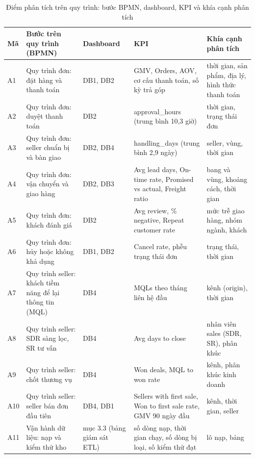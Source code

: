 \begin{table}[htbp]\centering\scriptsize\caption{Điểm phân tích trên quy trình: bước BPMN, dashboard, KPI và khía cạnh phân tích}\label{tab:diem-phan-tich}
\begin{tabular}{p{0.76cm}p{3.72cm}p{1.60cm}p{3.89cm}p{3.63cm}}\toprule
\textbf{Mã} & \textbf{Bước trên quy trình (BPMN)} & \textbf{Dashboard} & \textbf{KPI} & \textbf{Khía cạnh phân tích}\\\midrule
A1 & Quy trình đơn: đặt hàng và thanh toán & DB1, DB2 & GMV, Orders, AOV, cơ cấu thanh toán, số kỳ trả góp & thời gian, sản phẩm, địa lý, hình thức thanh toán\\
A2 & Quy trình đơn: duyệt thanh toán & DB2 & approval\_hours (trung bình 10,3 giờ) & thời gian, trạng thái đơn\\
A3 & Quy trình đơn: seller chuẩn bị và bàn giao & DB2, DB4 & handling\_days (trung bình 2,9 ngày) & seller, vùng, thời gian\\
A4 & Quy trình đơn: vận chuyển và giao hàng & DB2, DB3 & Avg lead days, On-time rate, Promised vs actual, Freight ratio & bang và vùng, khoảng cách, thời gian\\
A5 & Quy trình đơn: khách đánh giá & DB2 & Avg review, \% negative, Repeat customer rate & mức trễ giao hàng, nhóm ngành, khách\\
A6 & Quy trình đơn: hủy hoặc không khả dụng & DB1, DB2 & Cancel rate, phễu trạng thái đơn & trạng thái, thời gian\\
A7 & Quy trình seller: khách tiềm năng để lại thông tin (MQL) & DB4 & MQLs theo tháng liên hệ đầu & kênh (origin), thời gian\\
A8 & Quy trình seller: SDR sàng lọc, SR tư vấn & DB4 & Avg days to close & nhân viên sales (SDR, SR), phân khúc\\
A9 & Quy trình seller: chốt thương vụ & DB4 & Won deals, MQL to won rate & kênh, phân khúc kinh doanh\\
A10 & Quy trình seller: seller bán đơn đầu tiên & DB4, DB1 & Sellers with first sale, Won to first sale rate, GMV 90 ngày đầu & kênh, thời gian, seller\\
A11 & Vận hành dữ liệu: nạp và kiểm thử kho & mục 3.3 (bảng giám sát ETL) & số dòng nạp, thời gian chạy, số dòng bị loại, số kiểm thử đạt & lô nạp, bảng\\
\bottomrule\end{tabular}\end{table}
